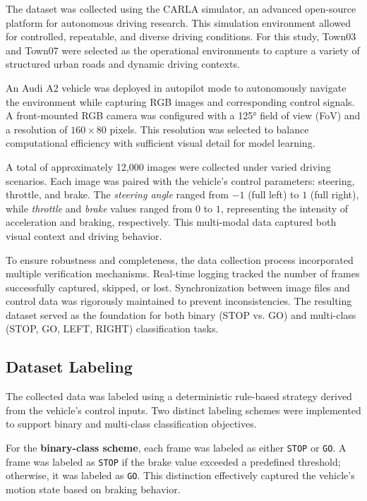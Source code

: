 The dataset was collected using the CARLA simulator\cite{CARLA2024docs}, an advanced open-source platform for autonomous driving research. This simulation environment allowed for controlled, repeatable, and diverse driving conditions. For this study, Town03 and Town07 were selected as the operational environments to capture a variety of structured urban roads and dynamic driving contexts.

An Audi A2 vehicle was deployed in autopilot mode to autonomously navigate the environment while capturing RGB images and corresponding control signals. A front-mounted RGB camera was configured with a 125° field of view (FoV) and a resolution of $160 \times 80$ pixels. This resolution was selected to balance computational efficiency with sufficient visual detail for model learning.

A total of approximately 12,000 images were collected under varied driving scenarios. Each image was paired with the vehicle’s control parameters: steering, throttle, and brake. The \textit{steering angle} ranged from $-1$ (full left) to $1$ (full right), while \textit{throttle} and \textit{brake} values ranged from $0$ to $1$, representing the intensity of acceleration and braking, respectively. This multi-modal data captured both visual context and driving behavior.

To ensure robustness and completeness, the data collection process incorporated multiple verification mechanisms. Real-time logging tracked the number of frames successfully captured, skipped, or lost. Synchronization between image files and control data was rigorously maintained to prevent inconsistencies. The resulting dataset served as the foundation for both binary (STOP vs. GO) and multi-class (STOP, GO, LEFT, RIGHT) classification tasks.

\subsection{Dataset Labeling}

The collected data was labeled using a deterministic rule-based strategy derived from the vehicle’s control inputs. Two distinct labeling schemes were implemented to support binary and multi-class classification objectives.

For the \textbf{binary-class scheme}, each frame was labeled as either \texttt{STOP} or \texttt{GO}. A frame was labeled as \texttt{STOP} if the brake value exceeded a predefined threshold; otherwise, it was labeled as \texttt{GO}. This distinction effectively captured the vehicle's motion state based on braking behavior.

